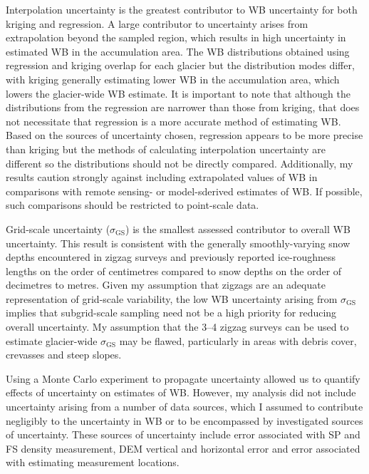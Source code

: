 \documentclass{sfuthesis}
\begin{document}
Interpolation uncertainty is the greatest contributor to WB uncertainty for both kriging and regression. A large contributor to uncertainty arises from extrapolation beyond the sampled region, which results in high uncertainty in estimated WB in the accumulation area. The WB distributions obtained using regression and kriging overlap for each glacier but the distribution modes differ, with kriging generally estimating lower WB in the accumulation area, which lowers the glacier-wide WB estimate. It is important to note that although the distributions from the regression are narrower than those from kriging, that does not necessitate that regression is a more accurate method of estimating WB. Based on the sources of uncertainty chosen, regression appears to be more precise than kriging but the methods of calculating interpolation uncertainty are different so the distributions should not be directly compared. Additionally, my results caution strongly against including extrapolated values of WB in comparisons with remote sensing- or model-sderived estimates of WB. If possible, such comparisons should be restricted to point-scale data.

Grid-scale uncertainty ($\sigma_{\mathrm{GS}}$) is the smallest assessed contributor to overall WB uncertainty. This result is consistent with the generally smoothly-varying snow depths encountered in zigzag surveys and previously reported ice-roughness lengths on the order of centimetres \citep[e.g.][]{Hock2005} compared to snow depths on the order of decimetres to metres. Given my assumption that zigzags are an adequate representation of grid-scale variability, the low WB uncertainty arising from $\sigma_{\mathrm{GS}}$ implies that subgrid-scale sampling need not be a high priority for reducing overall uncertainty. My assumption that the 3--4 zigzag surveys can be used to estimate glacier-wide $\sigma_{\mathrm{GS}}$ may be flawed, particularly in areas with debris cover, crevasses and steep slopes.

Using a Monte Carlo experiment to propagate uncertainty allowed us to quantify effects of uncertainty on estimates of WB. However, my analysis did not include uncertainty arising from a number of data sources, which I assumed to contribute negligibly to the uncertainty in WB or to be encompassed by investigated sources of uncertainty. These sources of uncertainty include error associated with SP and FS density measurement, DEM vertical and horizontal error and error associated with estimating measurement locations.
\end{document}
